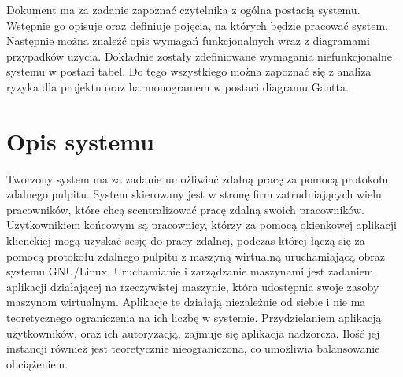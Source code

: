 \documentclass[12pt]{article}
\begin{document}

\abstract
Dokument ma za zadanie zapoznać czytelnika z ogólna postacią systemu.
Wstępnie go opisuje oraz definiuje pojęcia, na których będzie pracować system.
Następnie można znaleźć opis wymagań funkcjonalnych wraz z diagramami przypadków użycia.
Dokładnie zostały zdefiniowane wymagania niefunkcjonalne systemu w postaci tabel.
Do tego wszystkiego można zapoznać się z analiza ryzyka dla projektu oraz harmonogramem w postaci diagramu Gantta.

\begin{Revisions}
\end{Revisions}

\tableofcontents

\newpage


\section{Opis systemu}
Tworzony system ma za zadanie umożliwiać zdalną pracę za pomocą protokołu zdalnego pulpitu. System skierowany jest w stronę firm zatrudniających wielu pracowników, które chcą scentralizować pracę zdalną swoich pracowników. Użytkownikiem końcowym są pracownicy, którzy za pomocą okienkowej aplikacji klienckiej mogą uzyskać sesję do pracy zdalnej, podczas której łączą się za pomocą protokołu zdalnego pulpitu z maszyną wirtualną uruchamiającą obraz systemu GNU/Linux. Uruchamianie i zarządzanie maszynami jest zadaniem aplikacji działającej na rzeczywistej maszynie, która udostępnia swoje zasoby maszynom wirtualnym. Aplikacje te działają niezależnie od siebie i nie ma teoretycznego ograniczenia na ich liczbę w systemie. Przydzielaniem aplikacją użytkowników, oraz ich autoryzacją, zajmuje się aplikacja nadzorcza. Ilość jej instancji również jest teoretycznie nieograniczona, co umożliwia balansowanie obciążeniem.
\end{document}
